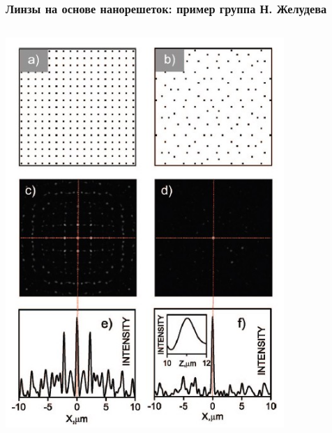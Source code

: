 \documentclass[9pt, compress, xcolor=table]{beamer}
\begin{document}
\begin{frame}[fragile]
\frametitle{Линзы на основе нанорешеток: пример группа Н. Желудева}

\begin{columns}[c]

\column{6cm}
\begin{center}
\includegraphics[width=0.9\textwidth]{array_lense}
\end{center}
\column{6cm}
\begin{center}

\end{center}
\end{columns}
\end{frame}
\end{document}
